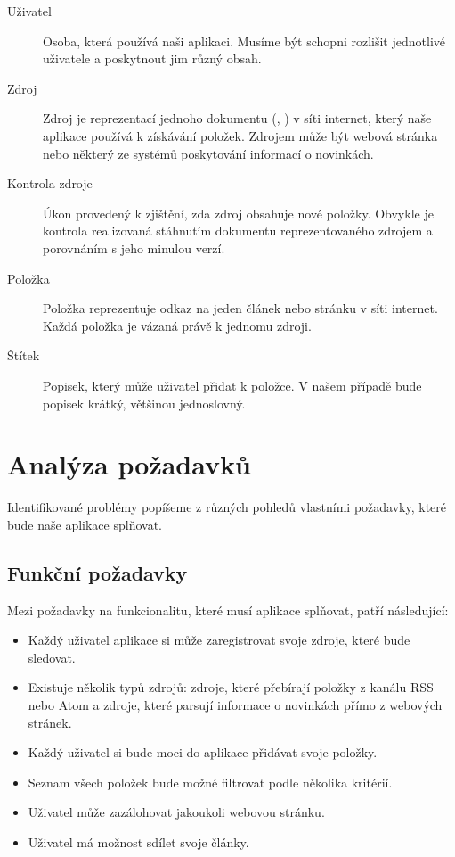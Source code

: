 \begin{description}
    \item[Uživatel] Osoba, která používá naši aplikaci.
		Musíme být schopni rozlišit jednotlivé uživatele a poskytnout jim různý obsah.
	\item[Zdroj] Zdroj je reprezentací jednoho dokumentu (, ) v síti internet, který naše aplikace používá k získávání položek.
		Zdrojem může být webová stránka nebo některý ze systémů poskytování informací o novinkách.
	\item[Kontrola zdroje] Úkon provedený k zjištění, zda zdroj obsahuje nové položky.
		Obvykle je kontrola realizovaná stáhnutím dokumentu reprezentovaného zdrojem a porovnáním s jeho minulou verzí.
    \item[Položka] Položka reprezentuje odkaz na jeden článek nebo stránku v síti internet.
		Každá položka je vázaná právě k jednomu zdroji.
    \item[Štítek] Popisek, který může uživatel přidat k položce.
		V našem případě bude popisek krátký, většinou jednoslovný.
\end{description}

\section{Analýza požadavků}

Identifikované problémy popíšeme z různých pohledů vlastními požadavky, které bude naše aplikace splňovat.

\subsection{Funkční požadavky}

Mezi požadavky na funkcionalitu, které musí aplikace splňovat, patří následující:

\begin{itemize}
    \item Každý uživatel aplikace si může zaregistrovat svoje zdroje, které bude sledovat.
    \item Existuje několik typů zdrojů: zdroje, které přebírají položky z kanálu RSS nebo Atom a zdroje, které parsují informace o novinkách přímo z webových stránek.
    \item Každý uživatel si bude moci do aplikace přidávat svoje položky.
    \item Seznam všech položek bude možné filtrovat podle několika kritérií.
	\item Uživatel může zazálohovat jakoukoli webovou stránku.
	\item Uživatel má možnost sdílet svoje články.
\end{itemize}


